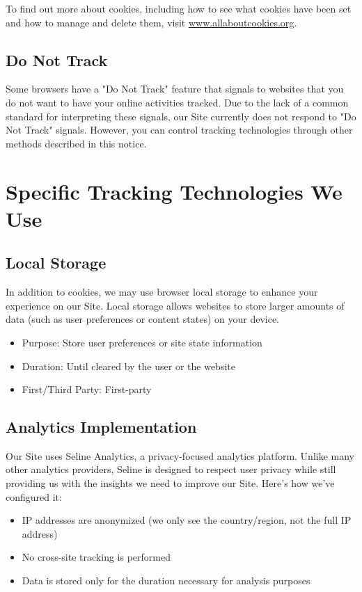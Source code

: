 \documentclass[11pt]{article}
\begin{document}
To find out more about cookies, including how to see what cookies have been set and how to manage and delete them, visit \href{http://www.allaboutcookies.org}{www.allaboutcookies.org}.

\subsection{Do Not Track}
Some browsers have a "Do Not Track" feature that signals to websites that you do not want to have your online activities tracked. Due to the lack of a common standard for interpreting these signals, our Site currently does not respond to "Do Not Track" signals. However, you can control tracking technologies through other methods described in this notice.

\section{Specific Tracking Technologies We Use}

\subsection{Local Storage}
In addition to cookies, we may use browser local storage to enhance your experience on our Site. Local storage allows websites to store larger amounts of data (such as user preferences or content states) on your device.

\begin{itemize}
  \item Purpose: Store user preferences or site state information
  \item Duration: Until cleared by the user or the website
  \item First/Third Party: First-party
\end{itemize}

\subsection{Analytics Implementation}
Our Site uses Seline Analytics, a privacy-focused analytics platform. Unlike many other analytics providers, Seline is designed to respect user privacy while still providing us with the insights we need to improve our Site. Here's how we've configured it:

\begin{itemize}
  \item IP addresses are anonymized (we only see the country/region, not the full IP address)
  \item No cross-site tracking is performed
  \item Data is stored only for the duration necessary for analysis purposes
\end{itemize}
\end{document}
